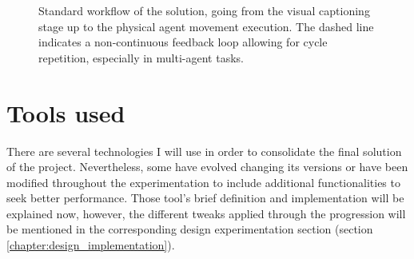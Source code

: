 \usetikzlibrary{arrows.meta, positioning, shapes.geometric}

\begin{figure}[h]
	\centering
	\caption{Standard workflow of the solution, going from the visual captioning stage up to the physical agent movement execution. The dashed line indicates a non-continuous feedback loop allowing for cycle repetition, especially in multi-agent tasks.}
	\label{fig:minimalist_workflow_cycle}
\end{figure}

\section{Tools used}
There are several technologies I will use in order to consolidate the final solution of the project. Nevertheless, some have evolved changing its versions or have been modified throughout the experimentation to include additional functionalities to seek better performance. Those tool's brief definition and implementation will be explained now, however, the different tweaks applied through the progression will be mentioned in the corresponding design experimentation section (section \ref{chapter:design_implementation}). 

